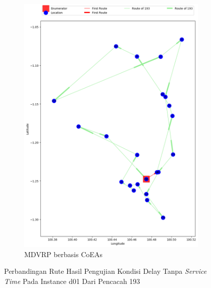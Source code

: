 \begin{figure}[H]
	\centering
	\begin{subfigure}[t]{\textwidth}
		\centering
		\includegraphics[width=\textwidth]{Resources/Images/delayed_1/real_m15_n100_delayed_1_193_coes}
		\caption{MDVRP berbasis CoEAs}
		\label{fig:real_m15_n100_delayed_1_193_coes}
	\end{subfigure}
	\caption{Perbandingan Rute Hasil Pengujian Kondisi Delay Tanpa \textit{Service Time} Pada Instance d01 Dari Pencacah 193}
	\label{fig:real_m15_n100_delayed_1_193}
\end{figure}


